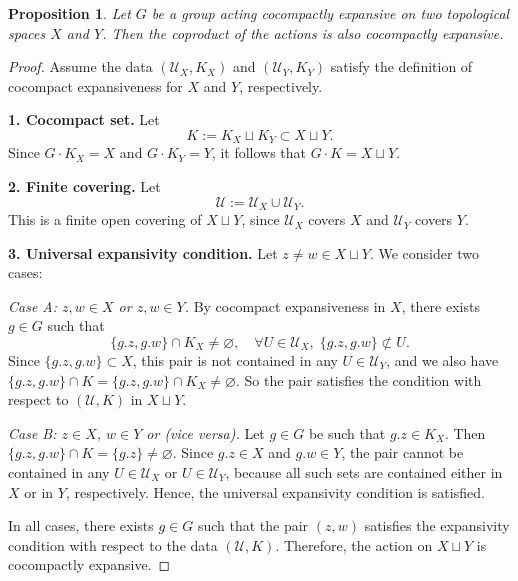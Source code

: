 \documentclass[12pt]{amsart}
\theoremstyle{plain}
\newtheorem{proposition}[theorem]{Proposition}
\theoremstyle{definition}
\theoremstyle{remark}
\begin{document}
\begin{proposition}
\label{th:coproducto}
Let \( G \) be a group acting cocompactly expansive on two topological spaces \( X \) and \( Y \). Then the coproduct of the actions is also cocompactly expansive.
\end{proposition}

\begin{proof}
Assume the data \( (\mathcal{U}_X, K_X) \) and \( (\mathcal{U}_Y, K_Y) \) satisfy the definition of cocompact expansiveness for \( X \) and \( Y \), respectively.

\medskip
\noindent\textbf{1. Cocompact set.}
Let
\[
K := K_X \sqcup K_Y \subset X \sqcup Y.
\]
Since \( G \cdot K_X = X \) and \( G \cdot K_Y = Y \), it follows that \( G \cdot K = X \sqcup Y \).

\medskip
\noindent\textbf{2. Finite covering.}
Let
\[
\mathcal{U} := \mathcal{U}_X \cup \mathcal{U}_Y.
\]
This is a finite open covering of \( X \sqcup Y \), since \( \mathcal{U}_X \) covers \( X \) and \( \mathcal{U}_Y \) covers \( Y \).

\medskip
\noindent\textbf{3. Universal expansivity condition.}
Let \( z \ne w \in X \sqcup Y \). We consider two cases:

\emph{Case A: \( z, w \in X \) or \( z, w \in Y\).}
By cocompact expansiveness in \( X \), there exists \( g \in G \) such that
\[
\{g.z, g.w\} \cap K_X \ne \varnothing,
\quad
\forall U \in \mathcal{U}_X, \;
\{g.z, g.w\} \not\subset U.
\]
Since \( \{g.z, g.w\} \subset X \), this pair is not contained in any \( U \in \mathcal{U}_Y \), and we also have \( \{g.z, g.w\} \cap K = \{g.z, g.w\} \cap K_X \ne \varnothing \). So the pair satisfies the condition with respect to \( (\mathcal{U}, K) \) in \( X \sqcup Y \).

\emph{Case B: \( z \in X \), \( w \in Y \) or (vice versa).}
Let \( g \in G \) be such that \( g.z \in K_X \). Then \( \{g.z, g.w\} \cap K = \{g.z\} \ne \varnothing \). Since \( g.z \in X \) and \( g.w \in Y \), the pair cannot be contained in any \( U \in \mathcal{U}_X \) or \( U \in \mathcal{U}_Y \), because all such sets are contained either in \( X \) or in \( Y \), respectively. Hence, the universal expansivity condition is satisfied.

\medskip

In all cases, there exists \( g \in G \) such that the pair \( (z,w) \) satisfies the expansivity condition with respect to the data \( (\mathcal{U}, K) \). Therefore, the action on \( X \sqcup Y \) is cocompactly expansive.
\end{proof}
\end{document}
